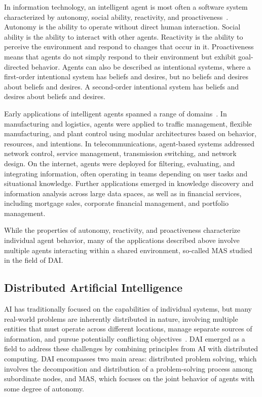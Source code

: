 \documentclass[
english,                 %
bibtex,                  %
]{kththesis}
\numberwithin{listing}{chapter}
\begin{document}
In information technology, an intelligent agent is most often a software system characterized by autonomy, social ability, reactivity, and proactiveness~\cite{wooldridge_intelligent_1995}. Autonomy is the ability to operate without direct human interaction. Social ability is the ability to interact with other agents. Reactivity is the ability to perceive the environment and respond to changes that occur in it. Proactiveness means that agents do not simply respond to their environment but exhibit goal-directed behavior. Agents can also be described as intentional systems, where a first-order intentional system has beliefs and desires, but no beliefs and desires about beliefs and desires. A second-order intentional system has beliefs and desires about beliefs and desires.

Early applications of intelligent agents spanned a range of domains~\cite{jennings_applications_1998}. In manufacturing and logistics, agents were applied to traffic management, flexible manufacturing, and plant control using modular architectures based on behavior, resources, and intentions. In telecommunications, agent-based systems addressed network control, service management, transmission switching, and network design. On the internet, agents were deployed for filtering, evaluating, and integrating information, often operating in teams depending on user tasks and situational knowledge. Further applications emerged in knowledge discovery and information analysis across large data spaces, as well as in financial services, including mortgage sales, corporate financial management, and portfolio management.

While the properties of autonomy, reactivity, and proactiveness characterize individual agent behavior, many of the applications described above involve multiple agents interacting within a shared environment, so-called \gls{MAS} studied in the field of \gls{DAI}.

\subsection{Distributed Artificial Intelligence}
\label{sec:bg_distributed_artificial_intelligence}
\glsresetall

\Gls{AI} has traditionally focused on the capabilities of individual systems, but many real-world problems are inherently distributed in nature, involving multiple entities that must operate across different locations, manage separate sources of information, and pursue potentially conflicting objectives~\cite{panait_cooperative_2005}. \Gls{DAI} emerged as a field to address these challenges by combining principles from \gls{AI} with distributed computing. \Gls{DAI} encompasses two main areas: distributed problem solving, which involves the decomposition and distribution of a problem-solving process among subordinate nodes, and \gls{MAS}, which focuses on the joint behavior of agents with some degree of autonomy.
\end{document}
